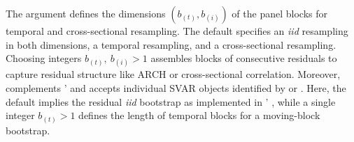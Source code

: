 The argument  defines the dimensions $ \left( b_{(t)}, b_{(i)} \right) $ of the panel blocks for temporal and cross-sectional resampling. The default  specifies an \textit{iid} resampling in both dimensions,  a temporal resampling, and  a cross-sectional resampling. Choosing integers $ b_{(t)}, \ b_{(i)} > 1 $ assembles blocks of consecutive residuals to capture residual structure like ARCH or cross-sectional correlation. Moreover,  complements '  \citep[Sec.~3.6 and 4.2]{LangeEtAl_fc} and accepts individual SVAR objects identified by  \citep{BreitungEtAl2004} or  \citep{JentschLunsford2022}. Here, the default  implies the residual \textit{iid} bootstrap as implemented in ' , while a single integer $ b_{(t)} > 1 $ defines the length of temporal blocks for a moving-block bootstrap.


